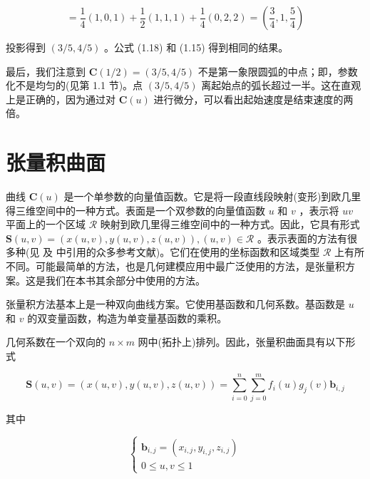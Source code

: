 \documentclass[../main.tex]{subfiles}
\begin{document}
\[
= \frac{1}{4}\left( {1,0,1}\right)  + \frac{1}{2}\left( {1,1,1}\right)  + \frac{1}{4}\left( {0,2,2}\right)  = \left( {\frac{3}{4},1,\frac{5}{4}}\right)
\]

投影得到 \(\left( {3/5,4/5}\right)\) 。公式 (1.18) 和 (1.15) 得到相同的结果。

最后，我们注意到 \(\mathbf{C}\left( {1/2}\right)  = \left( {3/5,4/5}\right)\) 不是第一象限圆弧的中点；即，参数化不是均匀的(见第 1.1 节)。点 \(\left( {3/5,4/5}\right)\) 离起始点的弧长超过一半。这在直观上是正确的，因为通过对 \(\mathbf{C}\left( u\right)\) 进行微分，可以看出起始速度是结束速度的两倍。



\section{张量积曲面}

曲线 \(\mathbf{C}\left( u\right)\) 是一个单参数的向量值函数。它是将一段直线段映射(变形)到欧几里得三维空间中的一种方式。表面是一个双参数的向量值函数 \(u\) 和 \(v\) ，表示将 \({uv}\) 平面上的一个区域 \(\mathcal{R}\) 映射到欧几里得三维空间中的一种方式。因此，它具有形式 \(\mathbf{S}\left( {u,v}\right)  = \left( {x\left( {u,v}\right) ,y\left( {u,v}\right) ,z\left( {u,v}\right) }\right) ,\left( {u,v}\right)  \in  \mathcal{R}\) 。表示表面的方法有很多种(见 \cite{Hosc93,Pieg89a,Pieg93} 及 \cite{Pieg89a} 中引用的众多参考文献)。它们在使用的坐标函数和区域类型 \(\mathcal{R}\) 上有所不同。可能最简单的方法，也是几何建模应用中最广泛使用的方法，是张量积方案。这是我们在本书其余部分中使用的方法。

张量积方法基本上是一种双向曲线方案。它使用基函数和几何系数。基函数是 \(u\) 和 \(v\) 的双变量函数，构造为单变量基函数的乘积。

几何系数在一个双向的 \(n \times  m\) 网中(拓扑上)排列。因此，张量积曲面具有以下形式

\[
\mathbf{S}\left( {u,v}\right)  = \left( {x\left( {u,v}\right) ,y\left( {u,v}\right) ,z\left( {u,v}\right) }\right)  = \mathop{\sum }\limits_{{i = 0}}^{n}\mathop{\sum }\limits_{{j = 0}}^{m}{f}_{i}\left( u\right) {g}_{j}\left( v\right) {\mathbf{b}}_{i,j} \tag{1.20}
\]

其中

\[
\left\{  \begin{array}{l} {\mathbf{b}}_{i,j} = \left( {{x}_{i,j},{y}_{i,j},{z}_{i,j}}\right) \\  0 \leq  u,v \leq  1 \end{array}\right.
\]
\end{document}
